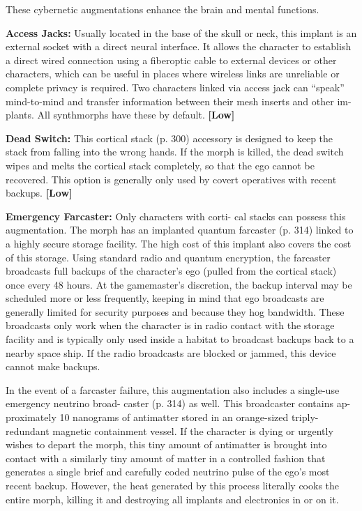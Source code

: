 These cybernetic augmentations enhance the brain 
and mental functions.

\textbf{Access Jacks:} Usually located in the base of the skull 
or neck, this implant is an external socket with a direct 
neural interface. It allows the character to establish a 
direct wired connection using a fiberoptic cable to 
external devices or other characters, which can be 
useful in places where wireless links are unreliable or 
complete privacy is required. Two characters linked 
via access jack can ``speak'' mind-to-mind and transfer 
information between their mesh inserts and other im-
plants. All synthmorphs have these by default. \textbf{[Low]}

\textbf{Dead Switch: }This cortical stack (p. 300) accessory is 
designed to keep the stack from falling into the wrong 
hands. If the morph is killed, the dead switch wipes 
and melts the cortical stack completely, so that the ego 
cannot be recovered. This option is generally only used 
by covert operatives with recent backups. \textbf{[Low]}

\textbf{Emergency Farcaster: }Only characters with corti-
cal stacks can possess this augmentation. The morph 
has an implanted quantum farcaster (p. 314) linked 
to a highly secure storage facility. The high cost of 
this implant also covers the cost of this storage. Using 
standard radio and quantum encryption, the farcaster 
broadcasts full backups of the character's ego (pulled 
from the cortical stack) once every 48 hours. At the 
gamemaster's discretion, the backup interval may be 
scheduled more or less frequently, keeping in mind 
that ego broadcasts are generally limited for security 
purposes and because they hog bandwidth. These 
broadcasts only work when the character is in radio 
contact with the storage facility and is typically only 
used inside a habitat to broadcast backups back to a 
nearby space ship. If the radio broadcasts are blocked 
or jammed, this device cannot make backups.

In the event of a farcaster failure, this augmentation 
also includes a single-use emergency neutrino broad-
caster (p. 314) as well. This broadcaster contains ap-
proximately 10 nanograms of antimatter stored in an 
orange-sized triply-redundant magnetic containment 
vessel. If the character is dying or urgently wishes to 
depart the morph, this tiny amount of antimatter is 
brought into contact with a similarly tiny amount of 
matter in a controlled fashion that generates a single 
brief and carefully coded neutrino pulse of the ego's 
most recent backup. However, the heat generated by 
this process literally cooks the entire morph, killing it 
and destroying all implants and electronics in or on it.

